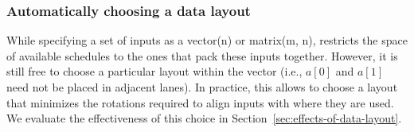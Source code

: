 \subsubsection*{Automatically choosing a data layout}
While specifying a set of inputs as a {\sf vector(n)} or {\sf matrix(m, n)}, \system restricts the space of available schedules to the ones that pack these inputs together.
However, it is still free to choose a particular layout within the vector (i.e., $a[0]$ and $a[1]$ need not be placed in adjacent lanes).
In practice, this allows \system to choose a layout that minimizes the rotations required to align inputs with where they are used.
We evaluate the effectiveness of this choice in Section~\ref{sec:effects-of-data-layout}.


